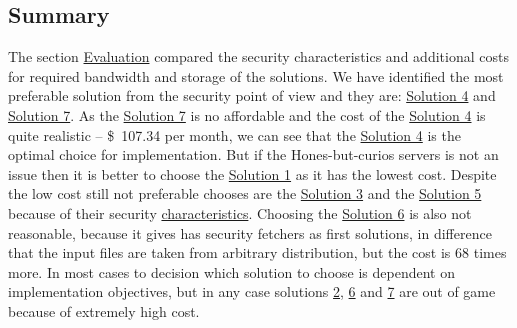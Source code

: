 \documentclass[12pt]{article}
\begin{document}




\subsection{Summary}
\label{sub:SummeryEva}

The section \hyperref[sec:5]{Evaluation} compared the security characteristics and additional costs for required bandwidth and storage of the solutions. We have identified the most preferable solution from the security point of view and they are: \hyperref[sub:Soltuion4]{Solution 4} and \hyperref[sub:Soltuion7]{Solution 7}. As the \hyperref[sub:Soltuion7]{Solution 7} is no affordable and the cost of the \hyperref[sub:Soltuion4]{Solution 4} is quite realistic -- \$\ 107.34 per month, we can see that the  \hyperref[sub:Soltuion4]{Solution 4} is the optimal choice for implementation. But if the Hones-but-curios servers  is not an issue then it is better to choose the \hyperref[sub:Soltuion1]{Solution 1} as it has the lowest cost. Despite the low cost still not preferable chooses are the \hyperref[sub:Soltuion3]{Solution 3} and the \hyperref[sub:Soltuion5]{Solution 5} because of their security \hyperref[table:Security]{characteristics}. Choosing the \hyperref[sub:Soltuion6]{Solution 6} is also not reasonable, because it gives has security fetchers  as first solutions, in difference that the input files are taken from arbitrary distribution, but the cost is $68$ times more. In most cases to decision which solution to choose is dependent on implementation objectives, but in any case solutions \hyperref[sub:Soltuion2]{2}, \hyperref[sub:Soltuion6]{6} and \hyperref[sub:Soltuion7]{7} are out of game because of extremely high cost. 




\end{document}
